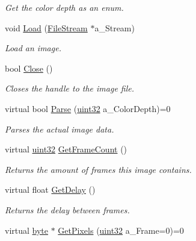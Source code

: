 \begin{DoxyCompactItemize}
\begin{DoxyCompactList}\small\item\em Get the color depth as an enum. \item\end{DoxyCompactList}\item 
void \hyperlink{classtil_1_1_image_aa8747fd600bc321cc0f2bea514a7d98b}{Load} (\hyperlink{classtil_1_1_file_stream}{FileStream} $\ast$a\_\-Stream)
\begin{DoxyCompactList}\small\item\em Load an image. \item\end{DoxyCompactList}\item 
bool \hyperlink{classtil_1_1_image_af6de495e7e1bea909e38b4eb1d1114e0}{Close} ()
\begin{DoxyCompactList}\small\item\em Closes the handle to the image file. \item\end{DoxyCompactList}\item 
virtual bool \hyperlink{classtil_1_1_image_a2436c982f6b403ab07591f06107fe432}{Parse} (\hyperlink{namespacetil_a20db61688ed403d11f057a508d87e54c}{uint32} a\_\-ColorDepth)=0
\begin{DoxyCompactList}\small\item\em Parses the actual image data. \item\end{DoxyCompactList}\item 
virtual \hyperlink{namespacetil_a20db61688ed403d11f057a508d87e54c}{uint32} \hyperlink{classtil_1_1_image_a78c10e07b535c99840b0afd5aa165df4}{GetFrameCount} ()
\begin{DoxyCompactList}\small\item\em Returns the amount of frames this image contains. \item\end{DoxyCompactList}\item 
virtual float \hyperlink{classtil_1_1_image_aabddc7f03e3d1962f5abb21c200f2050}{GetDelay} ()
\begin{DoxyCompactList}\small\item\em Returns the delay between frames. \item\end{DoxyCompactList}\item 
virtual \hyperlink{namespacetil_a5f3ec10aca1a788b495a0bd3787bc2dc}{byte} $\ast$ \hyperlink{classtil_1_1_image_a8dd46f6477025e23dc921e1a4a3f6a62}{GetPixels} (\hyperlink{namespacetil_a20db61688ed403d11f057a508d87e54c}{uint32} a\_\-Frame=0)=0

\end{DoxyCompactItemize}
